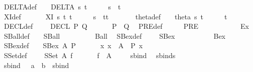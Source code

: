 \begin{isabellebody}
\ \ DELTA{\isacharunderscore}def{\isacharcolon}\ \ \ \ {\isachardoublequoteopen}DELTA\ s\ t\ \ \ \ \ {\isacharequal}{\isacharequal}\ s\ {\isacharampersand}\ t{\isachardoublequoteclose}\ \ \ \ \ \isanewline
\ \ XI{\isacharunderscore}def{\isacharcolon}\ \ \ \ \ \ \ {\isachardoublequoteopen}XI\ s\ t\ t{\isacharprime}\ \ \ \ \ {\isacharequal}{\isacharequal}\ s\ {\isacharampersand}\ t{\isacharequal}t{\isacharprime}{\isachardoublequoteclose}\ \ \ \ \ \isanewline
\ \ theta{\isacharunderscore}def{\isacharcolon}\ \ \ \ {\isachardoublequoteopen}theta\ s\ t\ \ \ \ \ {\isacharequal}{\isacharequal}\ t{\isachardoublequoteclose}\ \ \ \ \ \isanewline
\ \ DECL{\isacharunderscore}def{\isacharcolon}\ \ \ \ \ {\isachardoublequoteopen}DECL\ P\ Q\ \ \ \ \ \ {\isacharequal}{\isacharequal}\ P\ {\isacharampersand}\ Q{\isachardoublequoteclose}\isanewline
\ \ PRE{\isacharunderscore}def{\isacharcolon}\ \ \ \ \ \ {\isachardoublequoteopen}PRE\ \ \ \ \ \ \ \ \ \ \ {\isacharequal}{\isacharequal}\ Ex{\isachardoublequoteclose}\isanewline
\ \ SBall{\isacharunderscore}def{\isacharcolon}\ \ \ \ {\isachardoublequoteopen}SBall\ \ \ \ \ \ \ \ \ {\isacharequal}{\isacharequal}\ Ball{\isachardoublequoteclose}\isanewline
\ \ SBex{\isacharunderscore}def{\isacharcolon}\ \ \ \ \ {\isachardoublequoteopen}SBex\ \ \ \ \ \ \ \ \ \ {\isacharequal}{\isacharequal}\ Bex{\isachardoublequoteclose}\isanewline
\ \ SBex{}{\isacharunderscore}def{\isacharcolon}\ \ \ \ {\isachardoublequoteopen}SBex{}\ A\ P\ \ \ \ \ {\isacharequal}{\isacharequal}\ {\isacharquery}{\isacharbang}\ x{\isachardot}\ x\ {\isacharcolon}\ A\ {\isacharampersand}\ P\ x{\isachardoublequoteclose}\isanewline
\ \ SSet{\isacharunderscore}def{\isacharcolon}\ \ \ \ \ {\isachardoublequoteopen}SSet\ A\ f\ \ \ \ \ \ {\isacharequal}{\isacharequal}\ f\ {\isacharbackquote}\ A{\isachardoublequoteclose}\isanewline
\ \ \isanewline
\isanewline
\isanewline
{}\isamarkupfalse%
\isanewline
\ \ sbind\isanewline
\ \ sbinds\isanewline
\isanewline
{}\isamarkupfalse%
\isanewline
\ \ {\isachardoublequoteopen}{\isacharunderscore}sbind{\isachardoublequoteclose}\ \ {\isacharcolon}{\isacharcolon}\ {\isachardoublequoteopen}{\isacharbrackleft}{\isacharprime}a\ {\isacharcomma}\ {\isacharprime}b{\isacharbrackright}\ {\isacharequal}{\isachargreater}\ sbind{\isachardoublequoteclose}\ \ \ \ \ \ \ \ \ \ {\isacharparenleft}{\isachardoublequoteopen}{\isacharparenleft}{}{\isacharunderscore}\ {\isachartilde}{\isachartilde}{\isachargreater}\ {\isacharunderscore}{\isacharparenright}{\isachardoublequoteclose}\ {}{}{\isacharparenright}\isanewline

\end{isabellebody}
